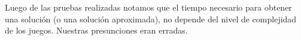 \documentclass[a4paper,spanish]{article}
\begin{document}
Luego de las pruebas realizadas notamos que el tiempo necesario para obtener una solución (o una solución aproximada), no depende del nivel de complejidad de los juegos. Nuestras presunciones eran erradas. 
% 
% 
% 
% 
% 
% 
% 
\end{document}
